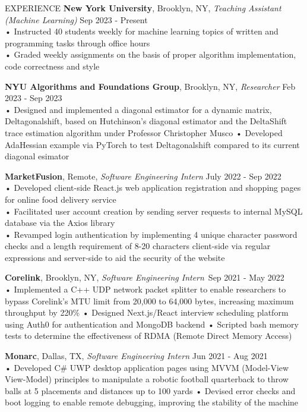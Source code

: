 \documentclass{resume} %
\begin{document}
\begin{rSection}{EXPERIENCE}
\textbf{New York University}, Brooklyn, NY, {\emph{Teaching Assistant (Machine Learning)}} \hfill Sep 2023 - Present \\
• Instructed 40 students weekly for machine learning topics of written and programming tasks through office hours \\
• Graded weekly assignments on the basis of proper algorithm implementation, code correctness and style 

\textbf {NYU Algorithms and Foundations Group}, Brooklyn, NY, {\emph{Researcher}} \hfill Feb 2023 - Sep 2023 \\
• Designed and implemented a diagonal estimator for a dynamic matrix, Deltagonalshift, based on Hutchinson's diagonal estimator and the DeltaShift trace estimation algorithm under Professor Christopher Musco \newline
• Developed AdaHessian example via PyTorch to test Deltagonalshift compared to its current diagonal esimator

\textbf{MarketFusion}, Remote, {\emph{Software Engineering Intern}} \hfill July 2022 - Sep 2022 \\
• Developed client-side React.js web application registration and shopping pages for online food delivery service \\
• Facilitated user account creation by sending server requests to internal MySQL database via the Axios library \\
• Revamped login authentication by implementing 4 unique character password checks and a length requirement of 8-20 characters client-side via regular expressions and server-side to aid the security of the website 

\textbf{Corelink}, Brooklyn, NY, {\emph{Software Engineering Intern}}\ \hfill Sep 2021 - May 2022 \\
• Implemented a C++ UDP network packet splitter to enable researchers to bypass Corelink's MTU limit from 20,000 to 64,000 bytes, increasing maximum throughput by 220\% \newline
• Designed Next.js/React interview scheduling platform using Auth0 for authentication and MongoDB backend \newline
• Scripted bash memory tests to determine the effectiveness of RDMA (Remote Direct Memory Access) 

\textbf{Monarc}, Dallas, TX, {\emph{Software Engineering Intern}} \hfill Jun 2021 - Aug 2021 \\
• Developed C\# UWP desktop application pages using MVVM (Model-View View-Model) principles to manipulate a robotic football quarterback to throw balls at 5 placements and distances up to 100 yards \newline
• Devised error checks and boot logging to enable remote debugging, improving the stability of the machine \smallskip
\end{rSection} 
\end{document}
